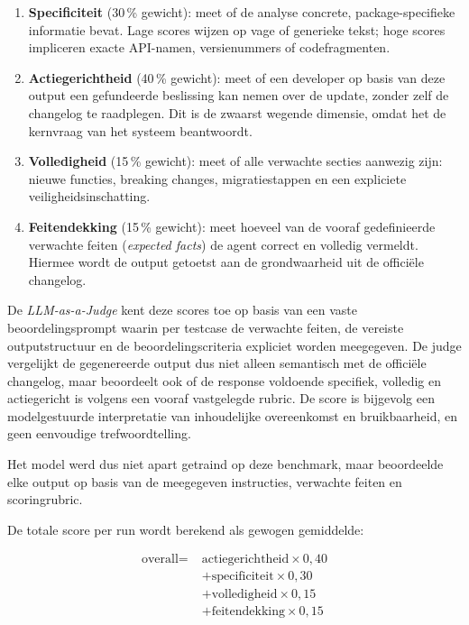\begin{enumerate}
    \item \textbf{Specificiteit} (30\,\% gewicht): meet of de analyse concrete, package-specifieke informatie bevat. Lage scores wijzen op vage of generieke tekst; hoge scores impliceren exacte API-namen, versienummers of codefragmenten.
    \item \textbf{Actiegerichtheid} (40\,\% gewicht): meet of een developer op basis van deze output een gefundeerde beslissing kan nemen over de update, zonder zelf de changelog te raadplegen. Dit is de zwaarst wegende dimensie, omdat het de kernvraag van het systeem beantwoordt.
    \item \textbf{Volledigheid} (15\,\% gewicht): meet of alle verwachte secties aanwezig zijn: nieuwe functies, breaking changes, migratiestappen en een expliciete veiligheidsinschatting.
    \item \textbf{Feitendekking} (15\,\% gewicht): meet hoeveel van de vooraf gedefinieerde verwachte feiten (\textit{expected facts}) de agent correct en volledig vermeldt. Hiermee wordt de output getoetst aan de grondwaarheid uit de officiële changelog.
\end{enumerate}

De \textit{LLM-as-a-Judge} kent deze scores toe op basis van een vaste beoordelingsprompt waarin per testcase de verwachte feiten, de vereiste outputstructuur en de beoordelingscriteria expliciet worden meegegeven. De judge vergelijkt de gegenereerde output dus niet alleen semantisch met de officiële changelog, maar beoordeelt ook of de response voldoende specifiek, volledig en actiegericht is volgens een vooraf vastgelegde rubric. De score is bijgevolg een modelgestuurde interpretatie van inhoudelijke overeenkomst en bruikbaarheid, en geen eenvoudige trefwoordtelling.

Het model werd dus niet apart getraind op deze benchmark, maar beoordeelde elke output op basis van de meegegeven instructies, verwachte feiten en scoringrubric.

De totale score per run wordt berekend als gewogen gemiddelde:

\begin{equation}
\begin{aligned}
\text{overall} =\;& \text{actiegerichtheid} \times 0{,}40 \\
&+ \text{specificiteit} \times 0{,}30 \\
&+ \text{volledigheid} \times 0{,}15 \\
&+ \text{feitendekking} \times 0{,}15
\end{aligned}
\label{eq:overallscore}
\end{equation}

